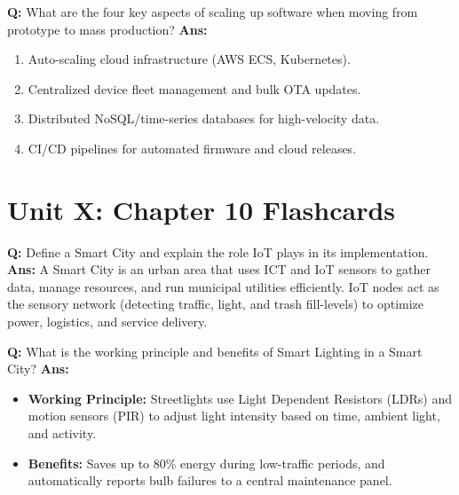 \documentclass[10pt,a4paper,twocolumn]{article}
\begin{document}
\begin{tcolorbox}[
  colback=white,
  colframe=UnitColorNine,
  colbacktitle=gray!10!white,
  coltitle=black,
  fonttitle=\bfseries\sffamily\small,
  title={Unit IX $\bullet$ Card 10},
  boxrule=1.2pt,
  arc=2mm,
  outer arc=2mm,
  boxsep=1.5mm,
  top=1mm,
  bottom=1mm,
  left=1.5mm,
  right=1.5mm,
  before skip=2.5mm,
  after skip=2.5mm
]
\textbf{Q:} What are the four key aspects of scaling up software when moving from prototype to mass production?
\tcbline
\textbf{Ans:} \begin{enumerate}
  \item Auto-scaling cloud infrastructure (AWS ECS, Kubernetes).
  \item Centralized device fleet management and bulk OTA updates.
  \item Distributed NoSQL/time-series databases for high-velocity data.
  \item CI/CD pipelines for automated firmware and cloud releases.
\end{enumerate}
\end{tcolorbox}

\section*{Unit X: Chapter 10 Flashcards}

\begin{tcolorbox}[
  colback=white,
  colframe=UnitColorTen,
  colbacktitle=gray!10!white,
  coltitle=black,
  fonttitle=\bfseries\sffamily\small,
  title={Unit X $\bullet$ Card 1},
  boxrule=1.2pt,
  arc=2mm,
  outer arc=2mm,
  boxsep=1.5mm,
  top=1mm,
  bottom=1mm,
  left=1.5mm,
  right=1.5mm,
  before skip=2.5mm,
  after skip=2.5mm
]
\textbf{Q:} Define a Smart City and explain the role IoT plays in its implementation.
\tcbline
\textbf{Ans:} A Smart City is an urban area that uses ICT and IoT sensors to gather data, manage resources, and run municipal utilities efficiently. IoT nodes act as the sensory network (detecting traffic, light, and trash fill-levels) to optimize power, logistics, and service delivery.
\end{tcolorbox}


\begin{tcolorbox}[
  colback=white,
  colframe=UnitColorTen,
  colbacktitle=gray!10!white,
  coltitle=black,
  fonttitle=\bfseries\sffamily\small,
  title={Unit X $\bullet$ Card 2},
  boxrule=1.2pt,
  arc=2mm,
  outer arc=2mm,
  boxsep=1.5mm,
  top=1mm,
  bottom=1mm,
  left=1.5mm,
  right=1.5mm,
  before skip=2.5mm,
  after skip=2.5mm
]
\textbf{Q:} What is the working principle and benefits of Smart Lighting in a Smart City?
\tcbline
\textbf{Ans:} \begin{itemize}
  \item \textbf{Working Principle:} Streetlights use Light Dependent Resistors (LDRs) and motion sensors (PIR) to adjust light intensity based on time, ambient light, and activity.
  \item \textbf{Benefits:} Saves up to 80\% energy during low-traffic periods, and automatically reports bulb failures to a central maintenance panel.
\end{itemize}
\end{tcolorbox}
\end{document}
